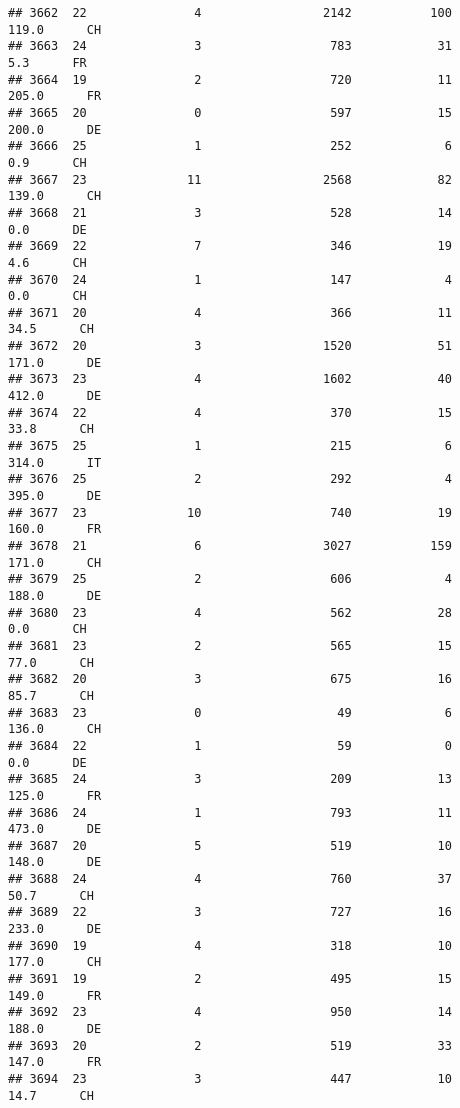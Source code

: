 \documentclass[
]{article}
\begin{document}
\begin{verbatim}
## 3662  22               4                 2142           100    119.0      CH
## 3663  24               3                  783            31      5.3      FR
## 3664  19               2                  720            11    205.0      FR
## 3665  20               0                  597            15    200.0      DE
## 3666  25               1                  252             6      0.9      CH
## 3667  23              11                 2568            82    139.0      CH
## 3668  21               3                  528            14      0.0      DE
## 3669  22               7                  346            19      4.6      CH
## 3670  24               1                  147             4      0.0      CH
## 3671  20               4                  366            11     34.5      CH
## 3672  20               3                 1520            51    171.0      DE
## 3673  23               4                 1602            40    412.0      DE
## 3674  22               4                  370            15     33.8      CH
## 3675  25               1                  215             6    314.0      IT
## 3676  25               2                  292             4    395.0      DE
## 3677  23              10                  740            19    160.0      FR
## 3678  21               6                 3027           159    171.0      CH
## 3679  25               2                  606             4    188.0      DE
## 3680  23               4                  562            28      0.0      CH
## 3681  23               2                  565            15     77.0      CH
## 3682  20               3                  675            16     85.7      CH
## 3683  23               0                   49             6    136.0      CH
## 3684  22               1                   59             0      0.0      DE
## 3685  24               3                  209            13    125.0      FR
## 3686  24               1                  793            11    473.0      DE
## 3687  20               5                  519            10    148.0      DE
## 3688  24               4                  760            37     50.7      CH
## 3689  22               3                  727            16    233.0      DE
## 3690  19               4                  318            10    177.0      CH
## 3691  19               2                  495            15    149.0      FR
## 3692  23               4                  950            14    188.0      DE
## 3693  20               2                  519            33    147.0      FR
## 3694  23               3                  447            10     14.7      CH

\end{verbatim}
\end{document}
